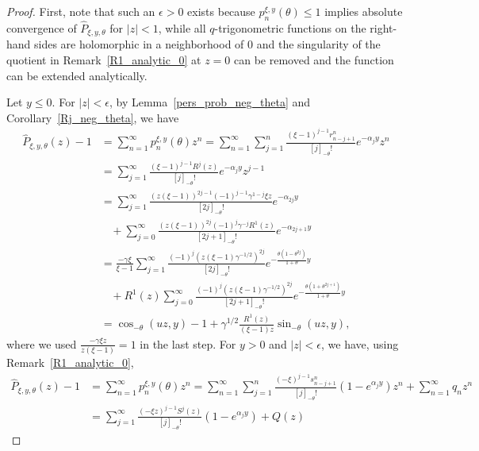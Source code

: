 \documentclass[10pt,a4paper]{amsart}
\newcommand{\1}{\mathds{1}}
\begin{document}
\begin{proof}
  First, note that such an $\epsilon>0$ exists because $p_n^{\xi,y}(\theta)\leq1$ implies absolute convergence of $\hat P_{\xi,y,\theta}$ for $|z|<1$, while all $q$-trigonometric functions on the right-hand sides are holomorphic in a neighborhood of $0$ and %
  the singularity of the quotient in Remark~\ref{R1_analytic_0} at $z=0$ can be removed and the function can be extended analytically.
  
  Let $y\le0$. For $|z|<\epsilon$, by Lemma~\ref{pers_prob_neg_theta} and Corollary~\ref{Rj_neg_theta}, we have
  \begin{align*}
     \hat{P}_{\xi,y,\theta}(z)-1
     &=\sum_{n=1}^{\infty}p_n^{\xi,y}(\theta)z^n
     =\sum_{n=1}^{\infty}\sum_{j=1}^n\frac{(\xi-1)^{j-1}r^n_{n-j+1}}{[j]_{-\theta}!}e^{-\alpha_jy}z^n
     \\&=\sum_{j=1}^\infty\frac{(\xi-1)^{j-1}R^j(z)}{[j]_{-\theta}!}e^{-\alpha_jy}z^{j-1}
      \\&=\sum_{j=1}^\infty\frac{(z(\xi-1))^{2j-1}(-1)^{j-1}\gamma^{1-j}\xi z}{[2j]_{-\theta}!}e^{-\alpha_{2j}y}
     \\&~~~~
     +\sum_{j=0}^\infty\frac{(z(\xi-1))^{2j}(-1)^{j}\gamma^{-j}R^1(z)}{[2j+1]_{-\theta}!}e^{-\alpha_{2j+1}y}
     \\&=\frac{-\gamma \xi }{ \xi-1}\sum_{j=1}^\infty\frac{(-1)^{j}(z(\xi-1)\gamma^{-1/2})^{2j}}{[2j]_{-\theta}!}e^{-\frac{\theta(1-\theta^{2j})}{1+\theta}y}
     \\&~~~~+R^1(z)\sum_{j=0}^\infty\frac{(-1)^{j}(z(\xi-1)\gamma^{-1/2})^{2j}}{[2j+1]_{-\theta}!}e^{-\frac{\theta(1+\theta^{2j+1})}{1+\theta}y}
      \\&=\cos_{-\theta}(uz,y)-1
     +\gamma^{1/2}\frac{R^1(z)}{(\xi-1)z}\sin_{-\theta}(uz,y),
  \end{align*}
  where we used $\frac{-\gamma \xi z}{ z(\xi-1)}=1$ in the last step.  For $y>0$ and  $|z|<\epsilon$, we have, using Remark~\ref{R1_analytic_0},
   \begin{align*}
     \hat{P}_{\xi,y,\theta}(z)-1
     &=\sum_{n=1}^{\infty}p_n^{\xi,y}(\theta)z^n
     =\sum_{n=1}^{\infty}\sum_{j=1}^n\frac{(-\xi)^{j-1}s^n_{n-j+1}}{[j]_{-\theta}!}(1-e^{\alpha_jy})z^n+\sum_{n=1}^{\infty}q_nz^n
     \\&=\sum_{j=1}^\infty\frac{(-\xi z)^{j-1}S^j(z)}{[j]_{-\theta}!}(1-e^{\alpha_jy})+Q(z)

\end{align*}
\end{proof}
\end{document}
